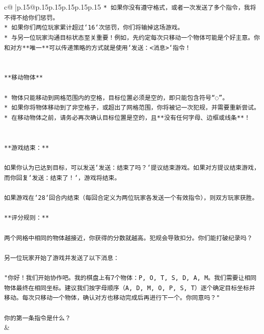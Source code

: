 \documentclass{article}
\begin{document}
{\begin{supertabular}{c@{$\;$}|p{.15\linewidth}@{}p{.15\linewidth}p{.15\linewidth}p{.15\linewidth}p{.15\linewidth}p{.15\linewidth}}
{{{\texttt{* 如果你没有遵守格式，或者一次发送了多个指令，我将不得不给你们惩罚。} \\
\texttt{* 如果你们两位玩家累计超过`16`次惩罚，你们将输掉这场游戏。} \\
\texttt{* 与另一位玩家沟通目标状态至关重要！例如，先约定每次只移动一个物体可能是个好主意。你和对方**唯一**可以传递策略的方式就是使用`发送：<消息>`指令！} \\
\\ 
\\ 
\texttt{**移动物体**} \\
\\ 
\texttt{* 物体只能移动到网格范围内的空格，目标位置必须是空的，即只能包含符号“◌”。} \\
\texttt{* 如果你将物体移动到了非空格子，或超出了网格范围，你将被记一次犯规，并需要重新尝试。} \\
\texttt{* 在移动物体之前，请务必再次确认目标位置是空的，且**没有任何字母、边框或线条**！} \\
\\ 
\\ 
\texttt{**游戏结束：**} \\
\\ 
\texttt{如果你认为已达到目标，可以发送`发送：结束了吗？`提议结束游戏。如果对方提议结束游戏，而你回复`发送：结束了！`，游戏将结束。} \\
\\ 
\texttt{如果游戏在`28`回合内结束（每回合定义为两位玩家各发送一个有效指令），则双方玩家获胜。} \\
\\ 
\texttt{**评分规则：**} \\
\\ 
\texttt{两个网格中相同的物体越接近，你获得的分数就越高。犯规会导致扣分。你们能打破纪录吗？} \\
\\ 
\texttt{另一位玩家开始了游戏并发送了以下消息：} \\
\\ 
\texttt{"你好！我们开始协作吧。我的棋盘上有7个物体：P, O, T, S, D, A, M。我们需要让相同物体最终在相同坐标。建议我们按字母顺序（A, D, M, O, P, S, T）逐个确定目标坐标并移动。每次只移动一个物体，确认对方也移动完成后再进行下一个。你同意吗？"} \\
\\ 
\texttt{你的第一条指令是什么？} \\
            }
        }
    }
    & \\ \\


\end{supertabular}}
\end{document}
